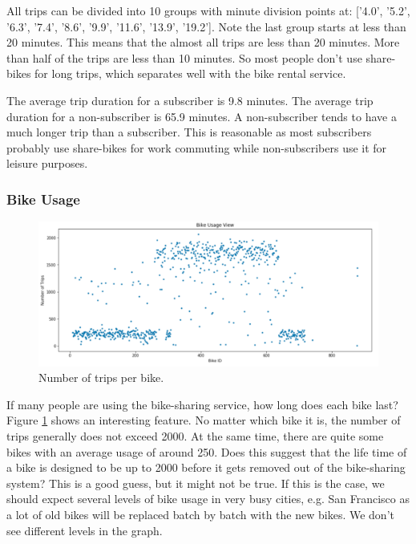 \documentclass[a4paper]{article}
\begin{document}
			All trips can be divided into 10 groups with minute division points at:
			['4.0', '5.2', '6.3', '7.4', '8.6', '9.9', '11.6', '13.9', '19.2']. Note the last group starts at less than 20 minutes. This means that the almost all trips are less than 20 minutes. More than half of the trips are less than 10 minutes. So most people don't use share-bikes for long trips, which separates well with the bike rental service.
			
			The average trip duration for a subscriber is 9.8 minutes. The average trip duration for a non-subscriber is 65.9 minutes. A non-subscriber tends to have a much longer trip than a subscriber. This is reasonable as most subscribers probably use share-bikes for work commuting while non-subscribers use it for leisure purposes.
			
			\subsubsection{Bike Usage}
			
			\begin{figure}
				\centering
				\includegraphics[width=1\textwidth]{BikeUsage.png}
				\caption{\label{fig:bike_usage}Number of trips per bike.}
			\end{figure}	

			If many people are using the bike-sharing service, how long does each bike last? Figure \ref{fig:bike_usage} shows an interesting feature. No matter which bike it is, the number of trips generally does not exceed 2000. At the same time, there are quite some bikes with an average usage of around 250. Does this suggest that the life time of a bike is designed to be up to 2000 before it gets removed out of the bike-sharing system? This is a good guess, but it might not be true. If this is the case, we should expect several levels of bike usage in very busy cities, e.g. San Francisco as a lot of old bikes will be replaced batch by batch with the new bikes. We don't see different levels in the graph.  
			
\end{document}
